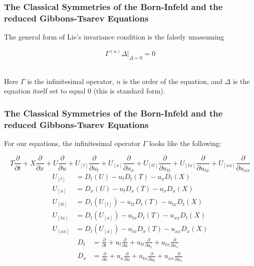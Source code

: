 \documentclass{beamer}
\begin{document}
\begin{frame}
    \frametitle{The Classical Symmetries of the Born-Infeld and the reduced Gibbons-Tsarev Equations}
        The general form of Lie's invariance condition is the falsely unassuming
        \vspace*{0.25in}
        \begin{Large}$$\Gamma^{(n)}\Delta |_{\Delta=0} = 0$$\end{Large}\\
        \vspace*{0.25in}
        Here $\Gamma$ is the infinitesimal operator, $n$ is the order of the equation, and $\Delta$ is the equation itself set to equal 0 (this is standard form).
\end{frame}


\begin{frame}
    \frametitle{The Classical Symmetries of the Born-Infeld and the reduced Gibbons-Tsarev Equations}
        For our equations, the infinitesimal operator $\Gamma$ looks like the following:
        \vspace*{0.125in}
        \begin{small}
            $$T\frac{\partial}{\partial t} + X\frac{\partial}{\partial x} + U\frac{\partial}{\partial u} + U_{[t]}\frac{\partial}{\partial u_t} + U_{[x]}\frac{\partial}{\partial u_x} + U_{[tt]}\frac{\partial}{\partial u_{tt}} + U_{[tx]}\frac{\partial}{\partial u_{tx}} + U_{[xx]}\frac{\partial}{\partial u_{xx}}$$
            \begin{align*}
                U_{[t]} &= D_t(U)-u_tD_t(T)-u_xD_t(X) \\
                U_{[x]} &= D_x(U)-u_tD_x(T)-u_xD_x(X) \\
                U_{[tt]} &= D_t(U_{[t]})-u_{tt}D_t(T)-u_{tx}D_t(X) \\
                U_{[tx]} &= D_t(U_{[x]})-u_{tx}D_t(T)-u_{xx}D_t(X) \\
                U_{[xx]} &= D_t(U_{[x]})-u_{tx}D_x(T)-u_{xx}D_x(X)
            \end{align*}
            \begin{align*}
                D_t &= \frac{\partial}{\partial t} + u_t\frac{\partial}{\partial u} + u_{tt}\frac{\partial}{\partial u_t} + u_{tx}\frac{\partial}{\partial u_x} \\
                D_x &= \frac{\partial}{\partial x} + u_x\frac{\partial}{\partial u} + u_{tx}\frac{\partial}{\partial u_t} + u_{xx}\frac{\partial}{\partial u_x}
            \end{align*}
        \end{small}
    \end{frame}
\end{document}
